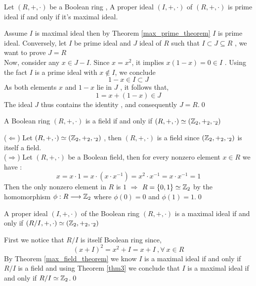 \vspace{.5cm}

\begin{theo}
    Let $(R,+,\cdot)$ be a Boolean ring , A proper ideal $(I,+,\cdot)$ of $(R,+,\cdot)$ is prime ideal if and only if it's maximal ideal.
\end{theo}
\begin{myproof}
   Assume \(I\) is maximal ideal then by Theorem \ref{max_prime_theorem} \(I\) is prime ideal. \noindent
   Conversely, let \(I\) be prime ideal and \(J\) ideal of \(R\) such that \(I\subset J\subseteq R\) , we want to prove \(J=R\)\\  
   Now, consider any \(x \in J - I\). Since \(x = x^2\), it implies \(x(1-x) = 0 \in I\) . Using the fact \(I\) is a prime ideal with \(x\notin I\), we conclude 
   \[
   1-x \in I \subset J
   \] 
   As both elements \(x\) and \(1-x\) lie in \(J\) , it follows that,
   \[
   1=x+(1-x) \in J
   \]
   The ideal \(J\) thus contains the identity , and consequently \(J=R\).\qed
\end{myproof}

\vspace{.5cm}

\begin{theo}
\label{thm3}
  A Boolean ring $(R,+,\cdot)$ is a field if and only if $(R,+,\cdot) \simeq (\mathbb{Z}_2,+_2,\cdot_2)$
\end{theo}
\begin{myproof}
   ($\Leftarrow$)
   Let $(R,+,\cdot) \simeq (\mathbb{Z}_2,+_2,\cdot_2)$ , then $(R,+,\cdot)$ is a field since $(\mathbb{Z}_2,+_2,\cdot_2)$ is itself a field.\\
   ($\Rightarrow$)
   Let $(R,+,\cdot)$ be a Boolean field, then for every nonzero element $x\in R$ we have :$$\displaystyle x=x\cdot 1=x\cdot (x\cdot x^{-1})=x^2\cdot x^{-1}=x\cdot x^{-1}=1$$Then the only nonzero element in $R$ is $1$ $\Longrightarrow$ $R=\{0,1\}\simeq \mathbb{Z}_2$ by the homomorphism $\phi:R\longrightarrow\mathbb{Z}_2$ where $\phi(0)=0$ and $\phi(1)=1$.\qed
\end{myproof}

\begin{cor}
\label{cor1}
    A proper ideal $(I,+,\cdot)$ of the Boolean ring $(R,+,\cdot)$ is a maximal ideal if and only if $(R/I,+,\cdot)\simeq(\mathbb{Z}_2,+_2,\cdot_2)$
\end{cor}
\begin{myproof}
    First we notice that $R/I$ is itself Boolean ring since, $$(x+I)^2=x^2+I=x+I\ ,\forall\ x\in R$$ By Theorem \ref{max_field_theorem} we know $I$ is a maximal ideal if and only if $R/I$ is a field and using Theorem \ref{thm3} we conclude that $I$ is a maximal ideal if and only if $R/I\simeq\mathbb{Z}_2$.\qed
\end{myproof}

